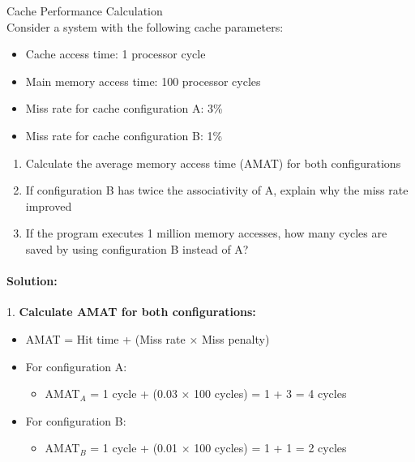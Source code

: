 \begin{example2}{Cache Performance Calculation}\\
Consider a system with the following cache parameters:
\begin{itemize}
    \item Cache access time: 1 processor cycle
    \item Main memory access time: 100 processor cycles
    \item Miss rate for cache configuration A: 3\%
    \item Miss rate for cache configuration B: 1\%
\end{itemize}

\begin{enumerate}
    \item Calculate the average memory access time (AMAT) for both configurations
    \item If configuration B has twice the associativity of A, explain why the miss rate improved
    \item If the program executes 1 million memory accesses, how many cycles are saved by using configuration B instead of A?
\end{enumerate}

\tcblower
\paragraph{Solution:}

1. \textbf{Calculate AMAT for both configurations:}
   \begin{itemize}
     \item AMAT = Hit time + (Miss rate × Miss penalty)
     \item For configuration A:
     \begin{itemize}
       \item AMAT$_A$ = 1 cycle + (0.03 × 100 cycles) = 1 + 3 = 4 cycles
     \end{itemize}
     \item For configuration B:
     \begin{itemize}
       \item AMAT$_B$ = 1 cycle + (0.01 × 100 cycles) = 1 + 1 = 2 cycles
     \end{itemize}
   \end{itemize}


\end{example2}
